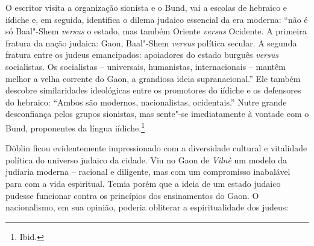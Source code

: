 O escritor visita a organização sionista e o Bund, vai a escolas de
hebraico e iídiche e, em seguida, identifica o dilema judaico essencial
da era moderna: ``não é só Baal"-Shem \textit{versus} o estado, mas também
Oriente \textit{versus} Ocidente. A primeira fratura da nação judaica:
Gaon, Baal"-Shem \textit{versus} política secular. A segunda fratura entre
os judeus emancipados: apoiadores do estado burguês \textit{versus}
socialistas. Os socialistas -- universais, humanistas, internacionais --
mantêm melhor a velha corrente do Gaon, a grandiosa ideia
supranacional.'' Ele também descobre similaridades ideológicas entre os
promotores do iídiche e os defensores do hebraico: ``Ambos são modernos,
nacionalistas, ocidentais.'' Nutre grande desconfiança pelos grupos
sionistas, mas sente"-se imediatamente à vontade com o Bund, proponentes
da língua iídiche.\footnote{Ibid.}

\asterisc

Döblin ficou evidentemente impressionado com a diversidade cultural e
vitalidade política do universo judaico da cidade. Viu no Gaon de \textit{Vilnè}
um modelo da judiaria moderna -- racional e diligente, mas com um
compromisso inabalável para com a vida espiritual. Temia porém que a
ideia de um estado judaico pudesse funcionar contra os princípios dos
ensinamentos do Gaon. O nacionalismo, em sua opinião, poderia obliterar
a espiritualidade dos judeus:

